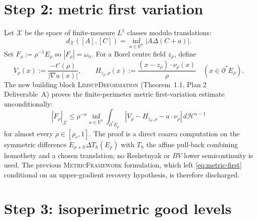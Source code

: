 \documentclass[11pt]{article}
\theoremstyle{definition}
\newcommand{\R}{\mathbb{R}}
\newcommand{\X}{\mathcal X}
\begin{document}
\section{Step 2: metric first variation}

Let $\X$ be the space of finite-measure $L^1$ classes modulo
translations:
\[
  d_\X([A],[C])=\inf_{a\in\R^n}|A\Delta(C+a)|.
\]
Set $F_\rho:=\rho^{-1}E_\rho$ so $|F_\rho|=\omega_n$.
For a Borel centre field $z_\rho$, define
\[
  V_\rho(x):=\frac{-t'(\rho)}{|\nabla u(x)|},
  \qquad
  H_{z_\rho,\rho}(x):=\frac{(x-z_\rho)\cdot\nu_\rho(x)}{\rho}
  \quad (x\in\partial^*E_\rho).
\]
The new building block \textsc{LimsupDeformation} (Theorem~1.1, Plan 2
Deliverable~A) proves the finite-perimeter metric first-variation
estimate unconditionally:
\begin{equation}\label{eq:metric-first}
  |\dot F_\rho|_\X
  \le \rho^{-n}\inf_{a\in\R^n}
  \int_{\partial^*E_\rho}
  |V_\rho-H_{z_\rho,\rho}-a\cdot\nu_\rho|\,d\mathcal H^{n-1}
\end{equation}
for almost every $\rho\in[\rho_c,1]$.  The proof is a direct coarea
computation on the symmetric difference $E_{\rho+h}\Delta T_h(E_\rho)$
with $T_h$ the affine pull-back combining homothety and a chosen
translation; no Reshetnyak or $BV$ lower semicontinuity is used.  The
previous \textsc{MetricFramework} formulation, which left
\eqref{eq:metric-first} conditional on an upper-gradient recovery
hypothesis, is therefore discharged.

\section{Step 3: isoperimetric good levels}
\end{document}
